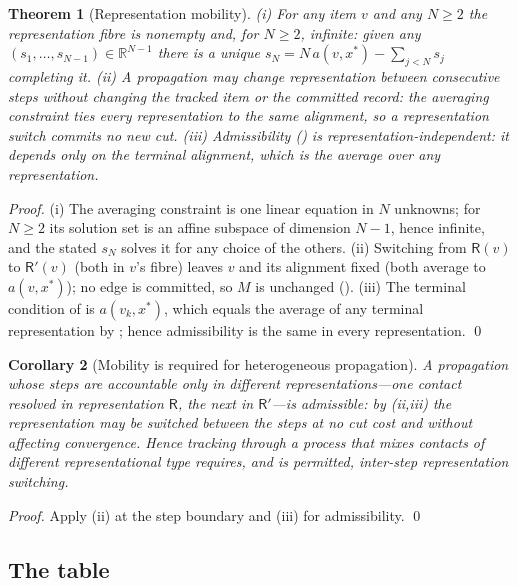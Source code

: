 \documentclass[11pt,a4paper]{article}
\theoremstyle{thmstyle}
\newtheorem{theorem}{Theorem}[section]
\newtheorem{corollary}[theorem]{Corollary}
\theoremstyle{definition}
\theoremstyle{remark}
\newcommand{\R}{\mathbb{R}}
\newcommand{\rec}{M}                     %
\newcommand{\Rep}{\mathsf{R}}            %
\begin{document}
\begin{theorem}[Representation mobility]
\label{thm:rep-mobility}
\textup{(i)} For any item $v$ and any $N\ge2$ the representation fibre is
nonempty and, for $N\ge2$, infinite: given any
$(s_1,\dots,s_{N-1})\in\R^{N-1}$ there is a unique
$s_N=N\,a(v,x^{\ast})-\sum_{j<N}s_j$ completing it. \textup{(ii)} A
propagation may change representation between consecutive steps without
changing the tracked item or the committed record: the averaging
constraint ties every representation to the same alignment, so a
representation switch commits no new cut. \textup{(iii)} Admissibility
() is representation-independent: it depends only on
the terminal alignment, which is the average over any representation.
\end{theorem}

\begin{proof}
(i) The averaging constraint is one linear equation in $N$ unknowns; for
$N\ge2$ its solution set is an affine subspace of dimension $N-1$, hence
infinite, and the stated $s_N$ solves it for any choice of the others.
(ii) Switching from $\Rep(v)$ to $\Rep'(v)$ (both in $v$'s fibre) leaves
$v$ and its alignment fixed (both average to $a(v,x^{\ast})$); no edge is
committed, so $\rec$ is unchanged (). (iii) The
terminal condition of  is $a(v_k,x^{\ast})$, which
equals the average of any terminal representation by
; hence admissibility is the same in every
representation. \qed
\end{proof}

\begin{corollary}[Mobility is required for heterogeneous propagation]
\label{cor:mobility-required}
A propagation whose steps are accountable only in different
representations---one contact resolved in representation $\Rep$, the next
in $\Rep'$---is admissible: by (ii,iii) the
representation may be switched between the steps at no cut cost and without
affecting convergence. Hence tracking through a process that mixes contacts
of different representational type requires, and is permitted, inter-step
representation switching.
\end{corollary}

\begin{proof}
Apply (ii) at the step boundary and (iii) for
admissibility. \qed
\end{proof}

\subsection{The table}
\end{document}
